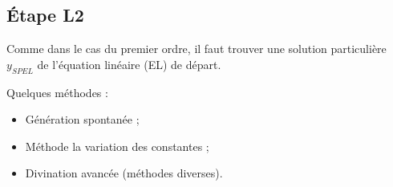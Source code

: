 \subsection{Étape L2}
\label{sec:etape-l2}
\begin{frame}
  Comme dans le cas du premier ordre, il faut trouver une solution particulière \(y_{SPEL}\) de l'équation linéaire (EL) de départ.\pause{}

  Quelques méthodes :\pause{}
  \begin{itemize}
  \item Génération spontanée ;\pause{}
  \item Méthode la variation des constantes ;\pause{}
  \item Divination avancée (méthodes diverses).
  \end{itemize}
\end{frame}
